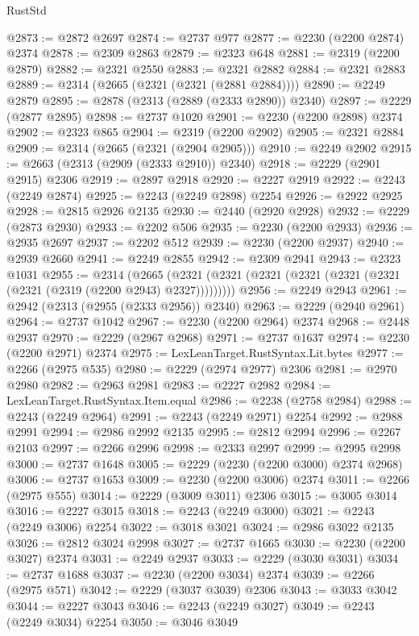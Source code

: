 \begin{lexlean}{RustStd}
\begin{coremodule}
@2873 := @2872 @2697
@2874 := @2737 @977
@2877 := @2230 (@2200 @2874) @2374
@2878 := @2309 @2863
@2879 := @2323 @648
@2881 := @2319 (@2200 @2879)
@2882 := @2321 @2550
@2883 := @2321 @2882
@2884 := @2321 @2883
@2889 := @2314 (@2665 (@2321 (@2321 (@2881 @2884))))
@2890 := @2249 @2879
@2895 := @2878 (@2313 (@2889 (@2333 @2890)) @2340)
@2897 := @2229 (@2877 @2895)
@2898 := @2737 @1020
@2901 := @2230 (@2200 @2898) @2374
@2902 := @2323 @865
@2904 := @2319 (@2200 @2902)
@2905 := @2321 @2884
@2909 := @2314 (@2665 (@2321 (@2904 @2905)))
@2910 := @2249 @2902
@2915 := @2663 (@2313 (@2909 (@2333 @2910)) @2340)
@2918 := @2229 (@2901 @2915) @2306
@2919 := @2897 @2918
@2920 := @2227 @2919
@2922 := @2243 (@2249 @2874)
@2925 := @2243 (@2249 @2898) @2254
@2926 := @2922 @2925
@2928 := @2815 @2926 @2135
@2930 := @2440 (@2920 @2928)
@2932 := @2229 (@2873 @2930)
@2933 := @2202 @506
@2935 := @2230 (@2200 @2933)
@2936 := @2935 @2697
@2937 := @2202 @512
@2939 := @2230 (@2200 @2937)
@2940 := @2939 @2660
@2941 := @2249 @2855
@2942 := @2309 @2941
@2943 := @2323 @1031
@2955 := @2314
    (@2665 (@2321 (@2321 (@2321 (@2321 (@2321 (@2321 (@2321 (@2319 (@2200 @2943) @2327)))))))))
@2956 := @2249 @2943
@2961 := @2942 (@2313 (@2955 (@2333 @2956)) @2340)
@2963 := @2229 (@2940 @2961)
@2964 := @2737 @1042
@2967 := @2230 (@2200 @2964) @2374
@2968 := @2448 @2937
@2970 := @2229 (@2967 @2968)
@2971 := @2737 @1637
@2974 := @2230 (@2200 @2971) @2374
@2975 := LexLeanTarget.RustSyntax.Lit.bytes
@2977 := @2266 (@2975 @535)
@2980 := @2229 (@2974 @2977) @2306
@2981 := @2970 @2980
@2982 := @2963 @2981
@2983 := @2227 @2982
@2984 := LexLeanTarget.RustSyntax.Item.equal
@2986 := @2238 (@2758 @2984)
@2988 := @2243 (@2249 @2964)
@2991 := @2243 (@2249 @2971) @2254
@2992 := @2988 @2991
@2994 := @2986 @2992 @2135
@2995 := @2812 @2994
@2996 := @2267 @2103
@2997 := @2266 @2996
@2998 := @2333 @2997
@2999 := @2995 @2998
@3000 := @2737 @1648
@3005 := @2229 (@2230 (@2200 @3000) @2374 @2968)
@3006 := @2737 @1653
@3009 := @2230 (@2200 @3006) @2374
@3011 := @2266 (@2975 @555)
@3014 := @2229 (@3009 @3011) @2306
@3015 := @3005 @3014
@3016 := @2227 @3015
@3018 := @2243 (@2249 @3000)
@3021 := @2243 (@2249 @3006) @2254
@3022 := @3018 @3021
@3024 := @2986 @3022 @2135
@3026 := @2812 @3024 @2998
@3027 := @2737 @1665
@3030 := @2230 (@2200 @3027) @2374
@3031 := @2249 @2937
@3033 := @2229 (@3030 @3031)
@3034 := @2737 @1688
@3037 := @2230 (@2200 @3034) @2374
@3039 := @2266 (@2975 @571)
@3042 := @2229 (@3037 @3039) @2306
@3043 := @3033 @3042
@3044 := @2227 @3043
@3046 := @2243 (@2249 @3027)
@3049 := @2243 (@2249 @3034) @2254
@3050 := @3046 @3049

\end{coremodule}
\end{lexlean}
